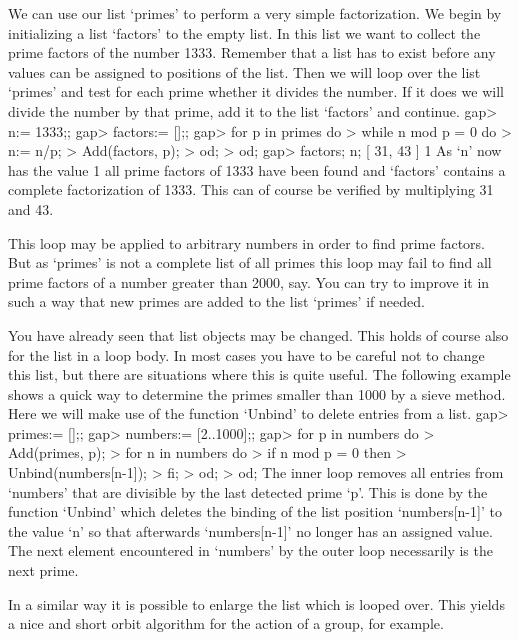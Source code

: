 We can use  our list `primes' to perform a very simple factorization.  We
begin by  initializing a list `factors' to the empty list.   In this list
we want to collect the prime factors of the number 1333.  Remember that a
list has to exist  before any values  can be assigned to positions of the
list.  Then we  will loop over the list `primes' and  test for each prime
whether it divides the  number.  If it does we will  divide the number by
that prime, add it to the list `factors' and continue.
\beginexample
    gap> n:= 1333;;
    gap> factors:= [];;
    gap> for p in primes do
    >       while n mod p = 0 do
    >          n:= n/p;
    >          Add(factors, p);
    >       od;
    >    od;
    gap> factors; n;
    [ 31, 43 ]
    1 
\endexample
As `n' now has the value 1 all prime factors  of 1333 have been found and
`factors' contains a complete factorization of  1333.  This can of course
be verified by multiplying 31 and 43.

This loop  may  be applied  to arbitrary  numbers in order  to find prime
factors.  But  as `primes' is not a complete list of all primes this loop
may fail  to find all prime factors of  a number greater than 2000,  say.
You  can try to improve it in such a way that new primes are added to the
list `primes' if needed.

You have already seen that list objects may be  changed.   This holds  of
course also for the  list in a loop body.  In most  cases  you have to be
careful not  to change this list, but there are situations  where this is
quite useful.  The following example  shows a quick way  to determine the
primes smaller than 1000 by a sieve method.  Here we will make use of the
function `Unbind' to delete entries from a list.
\beginexample
    gap> primes:= [];;
    gap> numbers:= [2..1000];;
    gap> for p in numbers do
    >       Add(primes, p);
    >       for n in numbers do
    >          if n mod p = 0 then
    >             Unbind(numbers[n-1]);
    >          fi;
    >       od;
    >    od;
\endexample
The inner loop  removes all entries from `numbers' that are  divisible by
the last detected prime `p'.  This is done by the function `Unbind' which
deletes the binding of the list position  `numbers[n-1]' to the value `n'
so that afterwards `numbers[n-1]' no longer has  an  assigned value.  The
next  element encountered in `numbers'  by the outer  loop necessarily is
the next prime.

In a similar way it is possible to enlarge the list which is looped over.
This yields a nice and short orbit  algorithm for the  action of a group,
for example.


